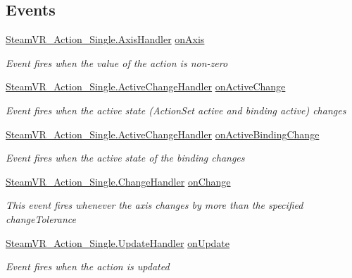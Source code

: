 \subsection*{Events}
\begin{DoxyCompactItemize}
\item 
\mbox{\hyperlink{class_valve_1_1_v_r_1_1_steam_v_r___action___single_a4193937cd6b6e4b7248374bc5636f6fd}{Steam\+V\+R\+\_\+\+Action\+\_\+\+Single.\+Axis\+Handler}} \mbox{\hyperlink{class_valve_1_1_v_r_1_1_steam_v_r___action___single___source_a023859c2a275b8f88920f706688fd26b}{on\+Axis}}
\begin{DoxyCompactList}\small\item\em Event fires when the value of the action is non-\/zero \end{DoxyCompactList}\item 
\mbox{\hyperlink{class_valve_1_1_v_r_1_1_steam_v_r___action___single_a45ad70dbb8a58191f373b7ae098b833b}{Steam\+V\+R\+\_\+\+Action\+\_\+\+Single.\+Active\+Change\+Handler}} \mbox{\hyperlink{class_valve_1_1_v_r_1_1_steam_v_r___action___single___source_ad6b3e0daabf6dbf1b719d1fee9fa7aee}{on\+Active\+Change}}
\begin{DoxyCompactList}\small\item\em Event fires when the active state (Action\+Set active and binding active) changes \end{DoxyCompactList}\item 
\mbox{\hyperlink{class_valve_1_1_v_r_1_1_steam_v_r___action___single_a45ad70dbb8a58191f373b7ae098b833b}{Steam\+V\+R\+\_\+\+Action\+\_\+\+Single.\+Active\+Change\+Handler}} \mbox{\hyperlink{class_valve_1_1_v_r_1_1_steam_v_r___action___single___source_a566dc4d2f667acd059038fc1a7e01c09}{on\+Active\+Binding\+Change}}
\begin{DoxyCompactList}\small\item\em Event fires when the active state of the binding changes \end{DoxyCompactList}\item 
\mbox{\hyperlink{class_valve_1_1_v_r_1_1_steam_v_r___action___single_ae0c72c83dccd88a0235e8a831d62116e}{Steam\+V\+R\+\_\+\+Action\+\_\+\+Single.\+Change\+Handler}} \mbox{\hyperlink{class_valve_1_1_v_r_1_1_steam_v_r___action___single___source_ac4dc468da3b5947b1e368fd124683c61}{on\+Change}}
\begin{DoxyCompactList}\small\item\em This event fires whenever the axis changes by more than the specified change\+Tolerance \end{DoxyCompactList}\item 
\mbox{\hyperlink{class_valve_1_1_v_r_1_1_steam_v_r___action___single_a1514666eabcafba498274e8d6cee2a40}{Steam\+V\+R\+\_\+\+Action\+\_\+\+Single.\+Update\+Handler}} \mbox{\hyperlink{class_valve_1_1_v_r_1_1_steam_v_r___action___single___source_aa5599e6469b2131d46da56da592530bd}{on\+Update}}
\begin{DoxyCompactList}\small\item\em Event fires when the action is updated \end{DoxyCompactList}\end{DoxyCompactItemize}
